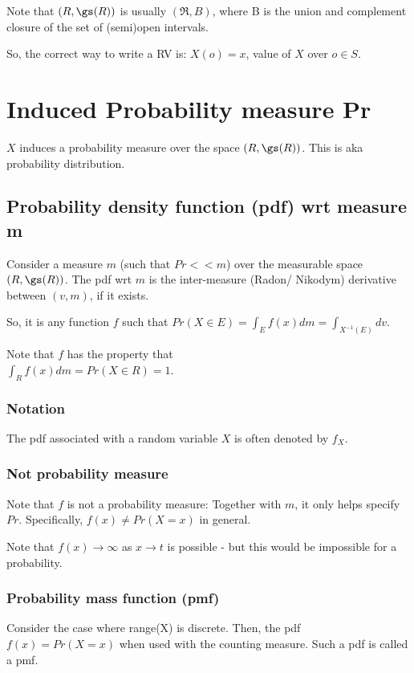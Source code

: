 \documentclass[oneside, article]{memoir}
\begin{document}
Note that $(R, \gs(R))$ is usually $(\Re, B)$, where B is the union and complement closure of the set of (semi)open intervals.

So, the correct way to write a RV is: $X(o) = x$, value of $X$ over $o \in S$.

\section{Induced Probability measure Pr}
$X$ induces a probability measure over the space $(R, \gs(R))$. This is aka probability distribution.


\subsection{Probability density function (pdf) wrt measure m}
Consider a measure $m$ (such that $Pr<<m$) over the measurable space $(R, \gs(R))$. The pdf wrt $m$ is the inter-measure (Radon/ Nikodym) derivative between $(v, m)$, if it exists.

So, it is any function $f$ such that $Pr(X \in E) = \int_E f(x) dm = \int_{X^{-1}(E)}dv$.

Note that $f$ has the property that \\$\int_{R} f(x) dm = Pr(X \in R) = 1$.

\subsubsection{Notation}
The pdf associated with a random variable $X$ is often denoted by $f_X$.

\subsubsection{Not probability measure}
Note that $f$ is not a probability measure: Together with $m$, it only helps specify $Pr$. Specifically, $f(x) \neq Pr(X=x)$ in general.

Note that $f(x) \to \infty$ as $x \to t$ is possible - but this would be impossible for a probability.

\subsubsection{Probability mass function (pmf)}
Consider the case where range(X) is discrete. Then, the pdf $f(x) = Pr(X = x)$ when used with the counting measure. Such a pdf is called a pmf.
\end{document}
